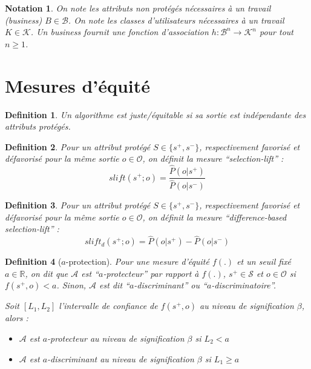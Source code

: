 \documentclass{article}
\newtheorem*{myNot}{Notation}
\newtheorem{myDef}{Definition}
\theoremstyle{definition}
\begin{document}
\begin{myNot}
  On note les attributs non protégés nécessaires à un travail (business) $B \in \mathcal{B}$.
  On note les classes d'utilisateurs nécessaires à un travail $K \in \mathcal{K}$.
  Un business fournit une fonction d'association $h : \mathcal{B}^{n} \rightarrow \mathcal{K}^{n}$ pour tout $n \geq 1$.
\end{myNot}



\section{Mesures d'équité}

\begin{myDef}
  \label{defSimple}
  Un algorithme est juste/équitable si sa sortie est indépendante des attributs protégés.
\end{myDef}

\begin{myDef}
  Pour un attribut protégé $S \in \{s^+, s^-\}$, respectivement favorisé et défavorisé pour la même sortie $o \in \mathcal{O}$, on définit la mesure ``selection-lift'' :
  \[
  slift(s^+;o) = \frac{\hat{P}(o|s^+)}{\hat{P}(o|s^-)}
  \]
\end{myDef}

\begin{myDef}
  Pour un attribut protégé $S \in \{s^+, s^-\}$, respectivement favorisé et défavorisé pour la même sortie $o \in \mathcal{O}$, on définit la mesure ``difference-based selection-lift'' :
  \[
  slift_{d}(s^+;o) = \hat{P}(o|s^+) - \hat{P}(o|s^-)
  \]
\end{myDef}

\begin{myDef}[$a$-protection]
  Pour une mesure d'équité $f(.)$ et un seuil fixé $a \in \mathbb{R}$, on dit que $\mathcal{A}$ est ``$a$-protecteur'' par rapport à $f(.)$, $s^{+} \in \mathcal{S}$ et $o \in \mathcal{O}$ si $f(s^{+},o) < a$. Sinon, $\mathcal{A}$ est dit ``$a$-discriminant'' ou ``$a$-discriminatoire''.

  Soit $\left[ L_{1} , L_{2} \right]$ l'intervalle de confiance de $f(s^{+},o)$ au niveau de signification $\beta$, alors :
  \begin{itemize}
  \item $\mathcal{A}$ est $a$-protecteur au niveau de signification $\beta$ si $L_{2} < a$
  \item $\mathcal{A}$ est $a$-discriminant au niveau de signification $\beta$ si $L_{1} \geq a$
  \end{itemize}
\end{myDef}
\end{document}
